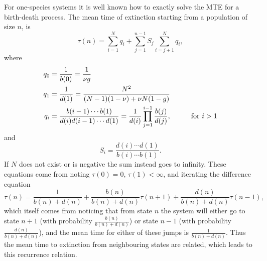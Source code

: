For one-species systems it is well known how to exactly solve the MTE for a birth-death process. 
The mean time of extinction starting from a population of size $n$, is \cite{Nisbet1982,Palamara2012}
\begin{equation}
\tau(n) = \sum_{i=1}^{N}q_i + \sum_{j=1}^{n-1} S_j\sum_{i=j+1}^{N}q_i,
\label{analytic_mte}
\end{equation}
where
\begin{align}
q_0 &= \frac{1}{b(0)} = \frac{1}{\nu g} \notag \\
q_1 &= \frac{1}{d(1)} = \frac{N^2}{(N-1)(1-\nu) + \nu N(1-g)} \\
q_i &= \frac{b(i-1)\cdots b(1)}{d(i)d(i-1)\cdots d(1)} = \frac{1}{d(i)}\prod_{j=1}^{i-1}\frac{b(j)}{d(j)}, \hspace{1cm} \text{for }i > 1 \notag
\end{align}
and
\begin{equation}
S_i = \frac{d(i)\cdots d(1)}{b(i)\cdots b(1)}.  
\end{equation}
If $N$ does not exist or is negative the sum instead goes to infinity. 
These equations come from noting $\tau(0)=0$, $\tau(1)<\infty$, and iterating the difference equation \cite{Nisbet1982,Palamara2012}
\begin{equation}
\tau(n) = \frac{1}{b(n)+d(n)} 
+ \frac{b(n)}{b(n)+d(n)}\tau(n+1) 
+ \frac{d(n)}{b(n)+d(n)}\tau(n-1),
 \label{mte-recurrence}
\end{equation}
which itself comes from noticing that from state $n$ the system will either go to state $n+1$ (with probability $\frac{b(n)}{b(n)+d(n)}$) or state $n-1$ (with probability $\frac{d(n)}{b(n)+d(n)}$), and the mean time for either of these jumps is $\frac{1}{b(n)+d(n)}$. 
Thus the mean time to extinction from neighbouring states are related, which leads to this recurrence relation. 

